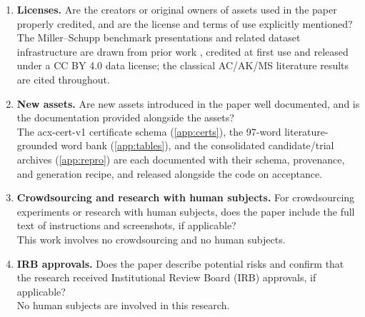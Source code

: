 \begin{enumerate}
  \item \textbf{Licenses.} Are the creators or original owners of assets used in the paper
    properly credited, and are the license and terms of use explicitly mentioned?\\
    \answerYes{} The Miller--Schupp benchmark presentations and related dataset
    infrastructure are drawn from prior work \cite{fagan2026twohump}, credited at first use
    and released under a CC BY 4.0 data license; the classical AC/AK/MS literature results
    are cited throughout.

  \item \textbf{New assets.} Are new assets introduced in the paper well documented, and is
    the documentation provided alongside the assets?\\
    \answerYes{} The acx-cert-v1 certificate schema (\ref{app:certs}), the 97-word
    literature-grounded word bank (\ref{app:tables}), and the consolidated candidate/trial
    archives (\ref{app:repro}) are each documented with their schema, provenance, and
    generation recipe, and released alongside the code on acceptance.

  \item \textbf{Crowdsourcing and research with human subjects.} For crowdsourcing
    experiments or research with human subjects, does the paper include the full text of
    instructions and screenshots, if applicable?\\
    \answerNA{} This work involves no crowdsourcing and no human subjects.

  \item \textbf{IRB approvals.} Does the paper describe potential risks and confirm that the
    research received Institutional Review Board (IRB) approvals, if applicable?\\
    \answerNA{} No human subjects are involved in this research.
\end{enumerate}

